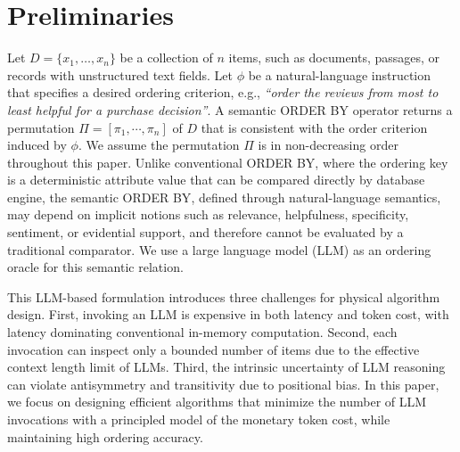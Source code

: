 \section{Preliminaries}
\label{sec:prelim}

Let $D=\{x_1,\dots,x_n\}$ be a collection of $n$ items, such as documents, passages, or records with unstructured text fields. 
Let $\phi$ be a natural-language instruction that specifies a desired ordering criterion, e.g., \emph{``order the reviews from most to least helpful for a purchase decision''}. 
A semantic \textsf{ORDER BY} operator returns a permutation $\Pi = [\pi_1, \cdots, \pi_n]$ of $D$ that is consistent with the order criterion induced by $\phi$. We assume the permutation $\Pi$ is in non-decreasing order throughout this paper. 
Unlike conventional \textsf{ORDER BY}, where the ordering key is a deterministic attribute value that can be compared directly by database engine, the semantic \textsf{ORDER BY},  defined through natural-language semantics, may depend on implicit notions such as relevance, helpfulness, specificity, sentiment, or evidential support, and therefore cannot be evaluated by a traditional comparator. We use a large language model (LLM) as an ordering oracle for this semantic relation. 

This LLM-based formulation introduces three challenges for physical algorithm design. First, invoking an LLM is expensive in both latency and token cost, with latency dominating conventional in-memory computation. Second, each invocation can inspect only a bounded number of items due to the effective context length limit of LLMs. Third, the intrinsic uncertainty of LLM reasoning can violate antisymmetry and transitivity due to positional bias. 
In this paper, we focus on designing efficient algorithms that minimize the number of LLM invocations with a principled model of the monetary token cost, while maintaining high ordering accuracy. 




